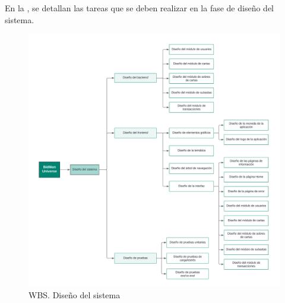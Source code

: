En la , se detallan las tareas que se deben realizar en la fase de diseño del sistema.
\begin{figure}[H]
    \hypertarget{fig:5_WBS-Diseno}{}
    \centering
    \includegraphics[width=0.9\linewidth]{figures/5-WBS/5_WBS-Diseno.png}
    \caption{WBS. Diseño del sistema}
    \label{fig:5_WBS-Diseno}
\end{figure}

